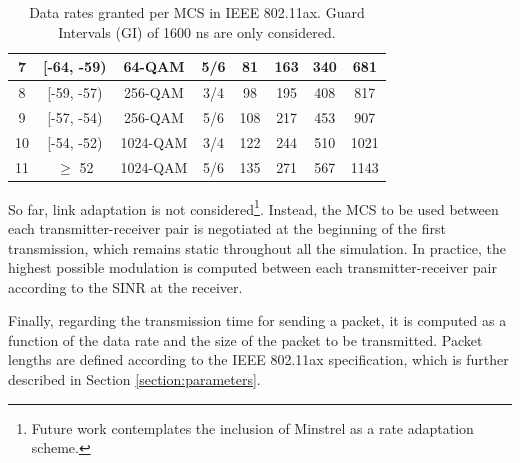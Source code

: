 \documentclass[a4paper]{article}
\begin{document}
\begin{table}[]
{\begin{tabular}{|c|c|c|c|c|c|c|c|}
			7 & {[}-64, -59) & 64-QAM & 5/6 & 81 & 163 & 340 & 681 \\ \hline
			8 & {[}-59, -57) & 256-QAM & 3/4 & 98 & 195 & 408 & 817 \\ \hline
			9 & {[}-57, -54) & 256-QAM & 5/6 & 108 & 217 & 453 & 907 \\ \hline
			10 & {[}-54, -52) & 1024-QAM & 3/4 & 122 & 244 & 510 & 1021 \\ \hline
			11 & $\geq$ 52 & 1024-QAM & 5/6 & 135 & 271 & 567 & 1143 \\ \hline
		\end{tabular}}
		\caption{Data rates granted per MCS in IEEE 802.11ax. Guard Intervals (GI) of 1600 ns are only considered.}
		\label{table:sinr_thresholds_mcs}	
	\end{table}
	
	So far, link adaptation is not considered\footnote{Future work contemplates the inclusion of Minstrel as a rate adaptation scheme.}. Instead, the MCS to be used between each transmitter-receiver pair is negotiated at the beginning of the first transmission, which remains static throughout all the simulation. In practice, the highest possible modulation is computed between each transmitter-receiver pair according to the SINR at the receiver.
		
	Finally, regarding the transmission time for sending a packet, it is computed as a function of the data rate and the size of the packet to be transmitted. Packet lengths are defined according to the IEEE 802.11ax specification, which is further described in Section \ref{section:parameters}.

\end{document}
